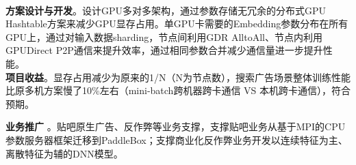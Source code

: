 \documentclass{resume}
\begin{document}
\begin{onehalfspacing}
\begin{itemize}
\\ \textbf{方案设计与开发}。设计GPU多对多架构，通过参数存储无冗余的分布式GPU Hashtable方案来减少GPU显存占用。单GPU卡需要的Embedding参数分布在所有GPU上，通过对输入数据sharding，节点间利用GDR AlltoAll、节点内利用GPUDirect P2P通信来提升效率，通过相同参数合并减少通信量进一步提升性能。
\\ \textbf{项目收益}。显存占用减少为原来的1/N（N为节点数），搜索广告场景整体训练性能比原多机方案慢了10\%左右（mini-batch跨机器跨卡通信 VS 本机跨卡通信），符合预期。
\end{itemize}
\textbf{业务推广} 。贴吧原生广告、反作弊等业务支撑，支撑贴吧业务从基于MPI的CPU参数服务器框架迁移到PaddleBox；支撑商业化反作弊业务开发以连续特征为主、离散特征为辅的DNN模型。

\end{onehalfspacing}

\end{document}
